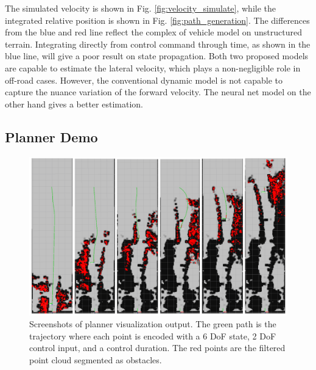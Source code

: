 \documentclass[../thesis.tex]{subfiles}
\begin{document}
The simulated velocity is shown in Fig. \ref{fig:velocity_simulate}, while the integrated relative position is shown in Fig. \ref{fig:path_generation}. The differences from the blue and red line reflect the complex of vehicle model on unstructured terrain. Integrating directly from control command through time, as shown in the blue line, will give a poor result on state propagation. Both two proposed models are capable to estimate the lateral velocity, which plays a non-negligible role in off-road cases. However, the conventional dynamic model is not capable to capture the nuance variation of the forward velocity. The neural net model on the other hand gives a better estimation.
 
 
 
\subsection{Planner Demo}
 
\begin{figure}[t]
    	\begin{center}
    	 \centerline{\includegraphics[width=0.8\columnwidth]{./RRTPlanner/fig/demo.png}}
           	\caption{Screenshots of planner visualization output. The green path is the trajectory where each point is encoded with a 6 DoF state, 2 DoF control input, and a control duration. The red points are the filtered point cloud segmented as obstacles.}
           	\label{fig:demo}
    	\end{center}
\end{figure}
 
\end{document}
